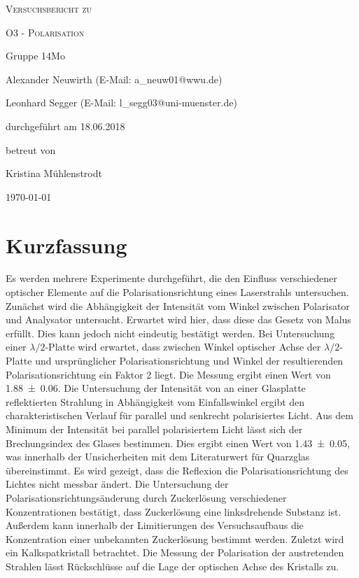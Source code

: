 \documentclass[
	a4paper,
	12pt,
	pagesize,
	ngerman
]{scrartcl}
\begin{document}
	
	\begin{titlepage}
		\centering
		{\scshape\LARGE Versuchsbericht zu \par}
		\vspace{1cm}
		{\scshape\huge O3 - Polarisation \par}
		\vspace{2.5cm}
		{\LARGE Gruppe 14Mo \par}
		\vspace{0.5cm}
		
		{\large Alexander Neuwirth (E-Mail: a\_neuw01@wwu.de) \par}
		{\large Leonhard Segger (E-Mail: l\_segg03@uni-muenster.de) \par}
		\vfill
		
		durchgeführt am 18.06.2018\par
		betreut von\par
		{\large Kristina Mühlenstrodt}
		
		\vfill
		
		{\large \today\par}
	\end{titlepage}
	\tableofcontents
	\newpage


	\section{Kurzfassung}
	Es werden mehrere Experimente durchgeführt, die den Einfluss verschiedener optischer Elemente auf die Polarisationsrichtung eines Laserstrahls untersuchen.
	Zunächst wird die Abhängigkeit der Intensität vom Winkel zwischen Polarisator und Analysator untersucht.
	Erwartet wird hier, dass diese das Gesetz von Malus erfüllt.
	Dies kann jedoch nicht eindeutig bestätigt werden.
	Bei Untersuchung einer $\lambda /2$-Platte wird erwartet, dass zwischen Winkel optischer Achse der  $\lambda /2$-Platte und ursprünglicher Polarisationsrichtung und Winkel der resultierenden Polarisationsrichtung ein Faktor 2 liegt.
	Die Messung ergibt einen Wert von \SI{1,88\pm 0,06}{}.
	Die Untersuchung der Intensität von an einer Glasplatte reflektierten Strahlung in Abhängigkeit vom Einfallswinkel ergibt den charakteristischen Verlauf für parallel und senkrecht polarisiertes Licht.
	Aus dem Minimum der Intensität bei parallel polarisiertem Licht lässt sich der Brechungsindex des Glases bestimmen.
	Dies ergibt einen Wert von \SI{1,43 \pm 0,05}{}, was innerhalb der Unsicherheiten mit dem Literaturwert für Quarzglas übereinstimmt.
	Es wird gezeigt, dass die Reflexion die Polarisationsrichtung des Lichtes nicht messbar ändert.
	Die Untersuchung der Polarisationsrichtungsänderung durch Zuckerlösung verschiedener Konzentrationen bestätigt, dass Zuckerlösung eine linksdrehende Substanz ist.
	Außerdem kann innerhalb der Limitierungen des Versuchsaufbaus die Konzentration einer unbekannten Zuckerlösung bestimmt werden.
	Zuletzt wird ein Kalkspatkristall betrachtet.
	Die Messung der Polarisation der austretenden Strahlen lässt Rückschlüsse auf die Lage der optischen Achse des Kristalls zu. %
\end{document}
